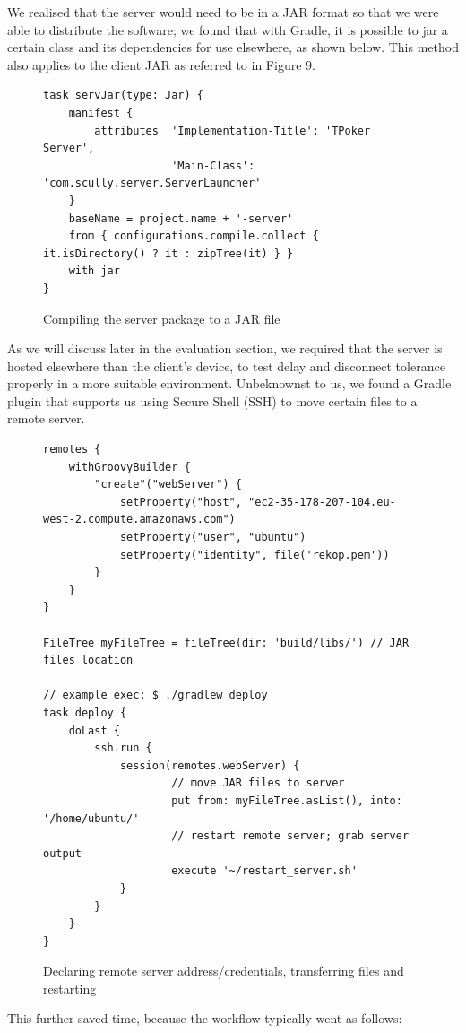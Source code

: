 \documentclass[11pt]{article}
\begin{document}
We realised that the server would need to be in a JAR format so that we were able to distribute the software; we found that with Gradle, it is possible to jar a certain class and its dependencies for use elsewhere, as shown below. This method also applies to the client JAR as referred to in Figure 9.
\begin{figure}[h]
\begin{lstlisting}[frame=single,framexleftmargin=10pt, framexrightmargin=15pt]
task servJar(type: Jar) {
    manifest {
        attributes 	'Implementation-Title': 'TPoker Server',
					'Main-Class': 'com.scully.server.ServerLauncher'
    }
    baseName = project.name + '-server'
    from { configurations.compile.collect { it.isDirectory() ? it : zipTree(it) } }
    with jar
}
\end{lstlisting}
\caption{Compiling the server package to a JAR file}
\end{figure}
\newpage
As we will discuss later in the evaluation section, we required that the server is hosted elsewhere than the client's device, to test delay and disconnect tolerance properly in a more suitable environment. Unbeknownst to us, we found a Gradle plugin that supports us using Secure Shell (SSH) to move certain files to a remote server. \\
\begin{figure}[h]
\begin{lstlisting}[frame=single,framexleftmargin=10pt, framexrightmargin=15pt]
remotes {
    withGroovyBuilder {
        "create"("webServer") {
            setProperty("host", "ec2-35-178-207-104.eu-west-2.compute.amazonaws.com")
            setProperty("user", "ubuntu")
            setProperty("identity", file('rekop.pem'))
        }
    }
}

FileTree myFileTree = fileTree(dir: 'build/libs/') // JAR files location

// example exec: $ ./gradlew deploy
task deploy {
    doLast {
        ssh.run {
            session(remotes.webServer) {
					// move JAR files to server
                	put from: myFileTree.asList(), into: '/home/ubuntu/' 
                	// restart remote server; grab server output
                	execute '~/restart_server.sh' 
            }
        }
    }
}
\end{lstlisting}
\caption{Declaring remote server address/credentials, transferring files and restarting}
\end{figure}

\newpage
This further saved time, because the workflow typically went as follows: \\
\end{document}
